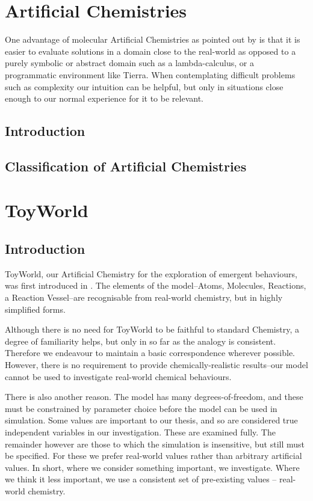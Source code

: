 \documentclass[]{report}
\begin{document}
\chapter{Artificial Chemistries}
One advantage of molecular Artificial Chemistries as pointed out by
\cite[5]{Funes2001} is that it is easier to evaluate solutions in
a domain close to the real-world as opposed to a purely symbolic or
abstract domain such as a lambda-calculus, or a programmatic environment
like Tierra. When contemplating difficult problems such as complexity
our intuition can be helpful, but only in situations close enough to our
normal experience for it to be relevant.
\section{Introduction}
\section{Classification of Artificial Chemistries}

\chapter{ToyWorld}

\section{Introduction}
ToyWorld, our Artificial Chemistry for the exploration of emergent
behaviours, was first introduced in \cite{Young2013}. The elements
of the model--Atoms, Molecules, Reactions, a Reaction Vessel--are
recognisable from real-world chemistry, but in highly simplified forms.

Although there is no need for ToyWorld to be faithful to standard
Chemistry, a degree of familiarity helps, but only in so far as the
analogy is consistent. Therefore we endeavour to maintain a basic
correspondence wherever possible. However, there is no requirement to
provide chemically-realistic results--our model cannot be used to
investigate real-world chemical behaviours.

There is also another reason. The model has many degrees-of-freedom, and
these must be constrained by parameter choice before the model can be
used in simulation. Some values are important to our thesis, and so are
considered true independent variables in our investigation. These are
examined fully. The remainder however are those to which the simulation
is insensitive, but still must be specified. For these we prefer
real-world values rather than arbitrary artificial values. In short,
where we consider something important, we investigate. Where we think it
less important, we use a consistent set of pre-existing values --
real-world chemistry.
\end{document}
